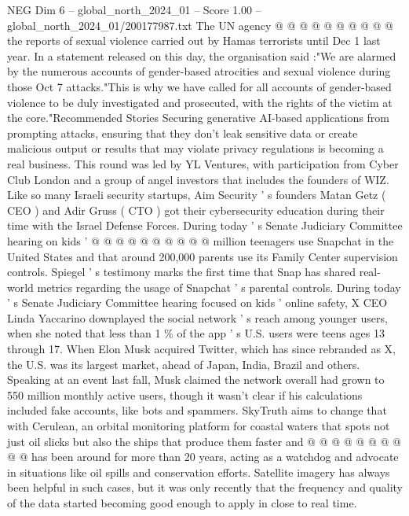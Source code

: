 \begin{textsample}{NEG Dim 6 – global\_north\_2024\_01 – Score 1.00 – global\_north\_2024\_01/200177987.txt}
The UN agency @ @ @ @ @ @ @ @ @ @ the reports of sexual violence carried out by Hamas terrorists until Dec 1 last year.
In a statement released on this day, the organisation said :"We are alarmed by the numerous accounts of gender-based atrocities and sexual violence during those Oct 7 attacks."This is why we have called for all accounts of gender-based violence to be duly investigated and prosecuted, with the rights of the victim at the core."Recommended Stories Securing generative AI-based applications from prompting attacks, ensuring that they don't leak sensitive data or create malicious output or results that may violate privacy regulations is becoming a real business.
This round was led by YL Ventures, with participation from Cyber Club London and a group of angel investors that includes the founders of WIZ.
Like so many Israeli security startups, Aim Security ' s founders Matan Getz ( CEO ) and Adir Gruss ( CTO ) got their cybersecurity education during their time with the Israel Defense Forces.
During today ' s Senate Judiciary Committee hearing on kids ' @ @ @ @ @ @ @ @ @ @ million teenagers use Snapchat in the United States and that around 200,000 parents use its Family Center supervision controls.
Spiegel ' s testimony marks the first time that Snap has shared real-world metrics regarding the usage of Snapchat ' s parental controls.
During today ' s Senate Judiciary Committee hearing focused on kids ' online safety, X CEO Linda Yaccarino downplayed the social network ' s reach among younger users, when she noted that less than 1 \% of the app ' s U.S. users were teens ages 13 through 17.
When Elon Musk acquired Twitter, which has since rebranded as X, the U.S. was its largest market, ahead of Japan, India, Brazil and others.
Speaking at an event last fall, Musk claimed the network overall had grown to 550 million monthly active users, though it wasn't clear if his calculations included fake accounts, like bots and spammers.
SkyTruth aims to change that with Cerulean, an orbital monitoring platform for coastal waters that spots not just oil slicks but also the ships that produce them faster and @ @ @ @ @ @ @ @ @ @ has been around for more than 20 years, acting as a watchdog and advocate in situations like oil spills and conservation efforts.
Satellite imagery has always been helpful in such cases, but it was only recently that the frequency and quality of the data started becoming good enough to apply in close to real time.

\end{textsample}
